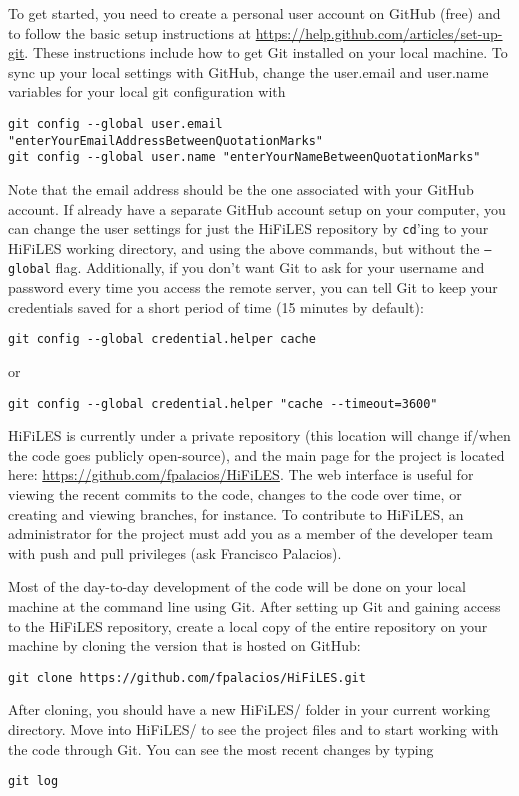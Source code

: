 \documentclass[letter,10pt]{article}
\begin{document}
To get started, you need to create a personal user account on GitHub (free) and to follow the basic setup instructions at
\url{https://help.github.com/articles/set-up-git}. These instructions include how to get Git installed on your local machine. To sync up your local settings with GitHub, change the user.email and user.name variables for your local git configuration with
\begin{verbatim}git config --global user.email "enterYourEmailAddressBetweenQuotationMarks" 
git config --global user.name "enterYourNameBetweenQuotationMarks"
\end{verbatim}
Note that the email address should be the one associated with your GitHub account.  If already have a separate GitHub account setup on your computer, you can change the user settings for just the HiFiLES repository by \texttt{cd}'ing to your HiFiLES working directory, and using the above commands, but without the \texttt{--global} flag.  Additionally, if you don't want Git to ask for your username and password every time you access the remote server, you can tell Git to keep your credentials saved for a short period of time (15 minutes by default):
\begin{verbatim}
git config --global credential.helper cache
\end{verbatim}
or
\begin{verbatim}
git config --global credential.helper "cache --timeout=3600"
\end{verbatim}
HiFiLES is currently under a private repository (this location will change if/when the code goes publicly open-source), and the main page for the project is located here: \url{https://github.com/fpalacios/HiFiLES}. The web interface is useful for viewing the recent commits to the code, changes to the code over time, or creating and viewing branches, for instance. To contribute to HiFiLES, an administrator for the project must add you as a member of the developer team with push and pull privileges (ask Francisco Palacios). 

Most of the day-to-day development of the code will be done on your local machine at the command line using Git. After setting up Git and gaining access to the HiFiLES repository, create a local copy of the entire repository on your machine by cloning the version that is hosted on GitHub:
\begin{verbatim}
git clone https://github.com/fpalacios/HiFiLES.git
\end{verbatim}
After cloning, you should have a new HiFiLES/ folder in your current working directory. Move into HiFiLES/ to see the project files and to start working with the code through Git. You can see the most recent changes by typing
\begin{verbatim}
git log
\end{verbatim}
\end{document}
